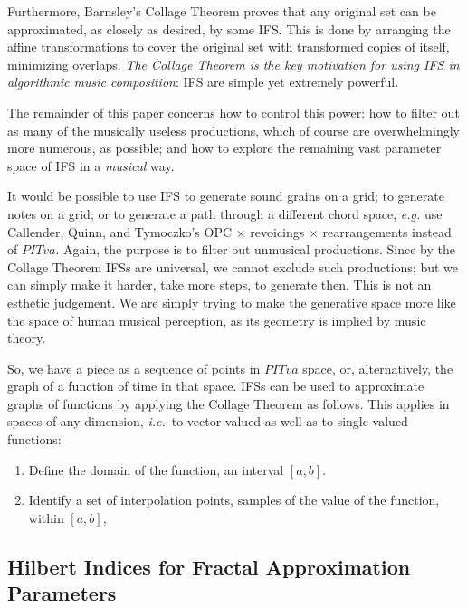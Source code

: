 \documentclass[english,11pt,letterpaper,onecolumn]{scrartcl}
\numberwithin{equation}{section}
\begin{document}
Furthermore, Barnsley's Collage Theorem \cite{barnsley:1986:solution} proves 
that any original set can be approximated, as closely as desired, by some IFS. 
This is done by arranging the affine transformations to cover the original set 
with transformed copies of itself, minimizing overlaps. \textit{The Collage 
Theorem is the key motivation for using IFS in algorithmic music composition}: 
IFS are simple yet extremely powerful. 

The remainder of this paper concerns how to control this power: how to 
filter out as many of the musically useless productions, which of course are 
overwhelmingly more numerous, as possible; and how to explore the 
remaining vast parameter space of IFS in a \textit{musical} way.

It would be possible to use IFS to generate sound grains on a grid; to 
generate notes on a grid; or to generate a path through a different chord 
space, \textit{e.g.} use Callender, Quinn, and Tymoczko's OPC $\times$ 
revoicings 
$\times$ rearrangements instead of $PITva$. Again, the purpose is to filter 
out unmusical productions. Since by the Collage Theorem IFSs are universal, we 
cannot exclude such productions; but we can simply make it harder, take more 
steps, to generate then. This is not an esthetic judgement. We are 
simply trying to make the generative space more like the space of human 
musical perception, as its geometry is implied by music theory.

So, we have a piece as a sequence of points in $PITva$ space, or, 
alternatively, the graph of a function of time in that space. IFSs can 
be used to approximate graphs of functions by applying the Collage Theorem 
as follows. This applies in spaces of any dimension, \textit{i.e.}\ to 
vector-valued as 
well as to single-valued functions:

\begin{enumerate}
 \item Define the domain of the function, an interval $[a, b]$.
 \item Identify a set of interpolation points, samples of the value of the 
function, within $[a, b]$, 
\end{enumerate}










\subsection{Hilbert Indices for Fractal Approximation Parameters}
\end{document}
